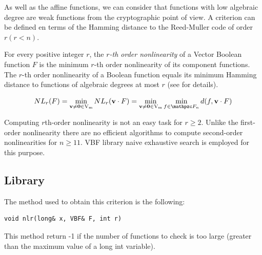 As well as the affine functions, we can consider that functions with low algebraic degree are weak functions from the cryptographic point of view. A criterion can be defined en terms of the Hamming distance to the Reed-Muller code of order $r (r < n)$.

\begin{definition}
For every positive integer $r$, the \textit{$r$-th order nonlinearity}
  of a Vector Boolean function $F$ is the minimum $r$-th order nonlinearity of
  its component functions. The $r$-th order nonlinearity of a Boolean function
  equals its minimum Hamming distance to functions of algebraic degrees at
  most $r$ (see \cite{carlet2008higher} for details).

\begin{equation}
\crit{NL}_r(F) = \min_{\vec{v} \neq \vec{0} \in \gf{V_m}} \crit{NL}_r(\vec{v} \cdot
F) = \min_{\vec{v} \neq \vec{0} \in \gf{V_m}} \min_{f \in \funct{F}_n} d(f,\vec{v} \cdot F) 
\end{equation}
\end{definition}

Computing $r$th-order nonlinearity is not an easy task for $r
  \geq 2$. Unlike the first-order nonlinearity there are no efficient
  algorithms to compute second-order nonlinearities for $n \geq 11$. VBF
  library naive exhaustive search is employed for this purpose.

\subsection{Library}

The method used to obtain this criterion is the following:

\begin{verbatim}
void nlr(long& x, VBF& F, int r)
\end{verbatim}

This method return -1 if the number of functions to check is too large (greater than the maximum value of a long int variable).

